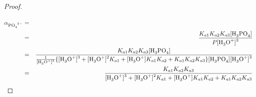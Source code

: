 \documentclass[10pt,twoside,a4paper]{article}
\begin{document}
\begin{proof}
 	\begin{eqnarray}
 		\alpha_{\ce{PO4^{3-}}} & = & \frac{\ce{[PO4^{3-}]}}{P} \hspace{-10cm} \nonumber  \\
 		& = & \frac{K_{a1}K_{a2}K_{a3}\ce{[H3PO4]}}{P\ce{[H3O+]^3}} \nonumber \\
 		& = & \frac{K_{a1}K_{a2}K_{a3}\ce{[H3PO4]}}{\frac{1}{\ce{[H3O+]^3}} \{ \ce{[H3O+]^3} + \ce{[H3O+]^2}K_{a1} + \ce{[H3O+]}K_{a1}K_{a2} + K_{a1}K_{a2}K_{a3}\}\ce{[H3PO4][H3O+]^3}} \nonumber \\
 		& = & \frac{K_{a1}K_{a2}K_{a3}}{\ce{[H3O+]^3} + \ce{[H3O+]^2}K_{a1} + \ce{[H3O+]}K_{a1}K_{a2} + K_{a1}K_{a2}K_{a3}}
 		\end{eqnarray}





	\end{proof}
\end{document}
